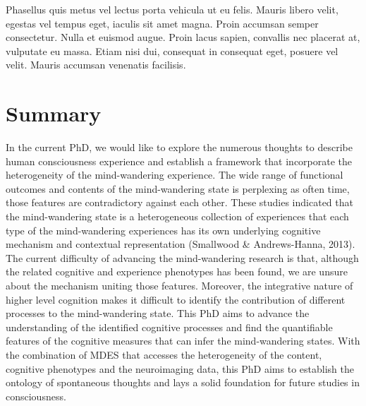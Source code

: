 Phasellus quis metus vel lectus porta vehicula ut eu felis. Mauris libero velit, egestas vel tempus eget, iaculis sit amet magna. Proin accumsan semper consectetur. Nulla et euismod augue. Proin lacus sapien, convallis nec placerat at, vulputate eu massa. Etiam nisi dui, consequat in consequat eget, posuere vel velit. Mauris accumsan venenatis facilisis.

\section{Summary}

In the current PhD, we would like to explore the numerous thoughts to describe human consciousness experience and establish a framework that incorporate the heterogeneity of the mind-wandering experience. The wide range of functional outcomes and contents of the mind-wandering state is perplexing as often time, those features are contradictory against each other. These studies indicated that the mind-wandering state is a heterogeneous collection of experiences that each type of the mind-wandering experiences has its own underlying cognitive mechanism and contextual representation (Smallwood \& Andrews-Hanna, 2013). The current difficulty of advancing the mind-wandering research is that, although the related cognitive and experience phenotypes has been found, we are unsure about the mechanism uniting those features. Moreover, the integrative nature of higher level cognition makes it difficult to identify the contribution of different processes to the mind-wandering state. This PhD aims to advance the understanding of the identified cognitive processes and find the quantifiable features of the cognitive measures that can infer the mind-wandering states. With the combination of MDES that accesses the heterogeneity of the content, cognitive phenotypes and the neuroimaging data, this PhD aims to establish the ontology of spontaneous thoughts and lays a solid foundation for future studies in consciousness. 
